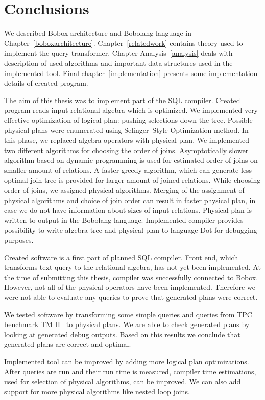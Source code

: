 \chapter{Conclusions}

We described Bobox architecture and Bobolang language in Chapter~\ref{boboxarchitecture}. Chapter~\ref{relatedwork} contains theory used to implement the query transformer. Chapter Analysis~\ref{analysis} deals with description of used algorithms and important data structures used in the implemented tool. Final chapter~\ref{implementation} presents some implementation details of created program.

The aim of this thesis was to implement part of the SQL compiler. Created program reads input relational algebra which is optimized. We implemented very effective optimization of logical plan: pushing selections down the tree. Possible physical plans were enumerated using Selinger--Style Optimization method. In this phase, we replaced algebra operators with physical plan. We implemented two different algorithms for choosing the order of joins. Asymptotically slower algorithm based on dynamic programming is used for estimated order of joins on smaller amount of relations. 
A faster greedy algorithm, which can generate less optimal join tree is provided for larger amount of joined relations. While choosing order of joins, we assigned physical algorithms. Merging of the assignment of physical algorithms and choice of join order can result in faster physical plan, in case we do not have information about sizes of input relations. Physical plan is written to output in the Bobolang language. Implemented compiler provides possibility to write algebra tree and physical plan to language Dot for debugging purposes.


Created software is a first part of planned SQL compiler. Front end, which transforms text query to the relational algebra, has not yet been implemented. At the time of submitting this thesis, compiler was successfully connected to Bobox. However, not all of the physical operators have been implemented. Therefore we were not able to evaluate any queries to prove that generated plans were correct.

We tested software by transforming some simple queries and queries from TPC benchmark TM H~\cite{benchmark} to physical plans. We are able to check generated plans by looking at generated debug outputs. Based on this results we conclude that generated plans are correct and optimal. 

Implemented tool can be improved by adding more logical plan optimizations.
After queries are run and their run time is measured, compiler time estimations, used for selection of physical algorithms, can be improved. 
We can also add support for more physical algorithms like nested loop joins.

